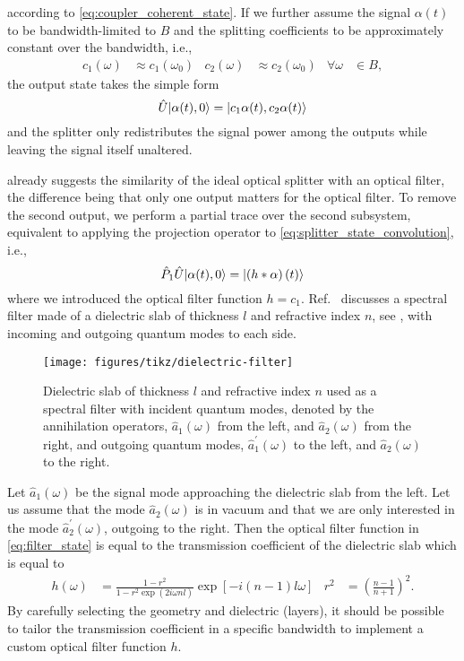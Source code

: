 according to \cref{eq:coupler_coherent_state}.
If we further assume the signal $\alpha(t)$ to be bandwidth-limited to $B$ and the splitting coefficients to be approximately constant over the bandwidth, i.e.,
\begin{align}
	c_1(\omega)
	&\approx
	c_1(\omega_0)
	&
	c_2(\omega)
	&\approx
	c_2(\omega_0)
	&
	\forall
	\omega
	&\in
	B
	,
\end{align}
the output state takes the simple form
\begin{equation}
	\hat{U}
	\ket*{\alpha(t),0}
	=
	\ket*{c_1\alpha(t),c_2\alpha(t)}
\end{equation}
and the splitter only redistributes the signal power among the outputs while leaving the signal itself unaltered.

 already suggests the similarity of the ideal optical splitter with an optical filter, the difference being that only one output matters for the optical filter.
To remove the second output, we perform a partial trace over the second subsystem, equivalent to applying the projection operator to \cref{eq:splitter_state_convolution}, i.e.,
\begin{equation}
	\hat{P}_1
	\hat{U}
	\ket*{\alpha(t),0}
	=
	\ket*{\left(h\conv\alpha\right)(t)}
	\label{eq:filter_state}
\end{equation}
where we introduced the optical filter function $h=c_1$.
Ref.~\cite[p.~199]{Vogel2006} discusses a spectral filter made of a dielectric slab of thickness $l$ and refractive index $n$, see , with incoming and outgoing quantum modes to each side.
\begin{figure}[htb]
    \centering
    \texttt{[image: figures/tikz/dielectric-filter]}
    \caption{Dielectric slab of thickness $l$ and refractive index $n$ used as a spectral filter with incident quantum modes, denoted by the annihilation operators, $\hat{a}_1(\omega)$ from the left, and $\hat{a}_2(\omega)$ from the right, and outgoing quantum modes, $\hat{a}_1^\prime(\omega)$ to the left, and $\hat{a}_2(\omega)$ to the right.}\label{fig:dielectric_filter}
\end{figure}
Let $\hat{a}_1(\omega)$ be the signal mode approaching the dielectric slab from the left.
Let us assume that the mode $\hat{a}_2(\omega)$ is in vacuum and that we are only interested in the mode $\hat{a}_2^\prime(\omega)$, outgoing to the right.
Then the optical filter function in \cref{eq:filter_state} is equal to the transmission coefficient of the dielectric slab which is equal to~\cite[p.~199]{Vogel2006}
\begin{align}
	h(\omega)
	&=
	\frac{1-r^2}{1-r^2\exp(2i\omega nl)}
	\exp\left[-i(n-1)l\omega\right]
	&
	r^2
	&=
	\left(\frac{n-1}{n+1}\right)^2
	.
\end{align}
By carefully selecting the geometry and dielectric (layers), it should be possible to tailor the transmission coefficient in a specific bandwidth to implement a custom optical filter function $h$.